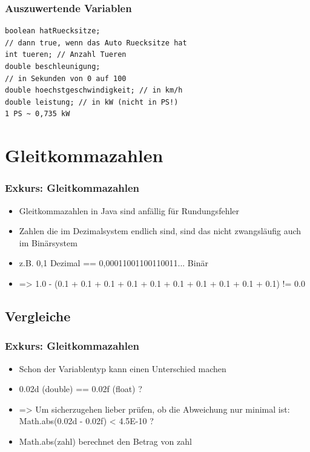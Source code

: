 \documentclass[final]{beamer}
\begin{document}
\begin{frame}[containsverbatim]
	\frametitle{Auszuwertende Variablen}
	\begin{lstlisting}
boolean hatRuecksitze; 
// dann true, wenn das Auto Ruecksitze hat
int tueren; // Anzahl Tueren
double beschleunigung; 
// in Sekunden von 0 auf 100
double hoechstgeschwindigkeit; // in km/h
double leistung; // in kW (nicht in PS!)
1 PS ~ 0,735 kW
	\end{lstlisting}
\end{frame}

\section{Gleitkommazahlen}
\begin{frame}
	\frametitle{Exkurs: Gleitkommazahlen}
	\begin{itemize}
		\item{Gleitkommazahlen in Java sind anfällig für Rundungsfehler}
		\item{Zahlen die im Dezimalsystem endlich sind, sind das nicht zwangsläufig auch im Binärsystem}
		\item{z.B. 0,1 Dezimal == 0,00011001100110011... Binär}
		\item{=> 1.0 - (0.1 + 0.1 + 0.1 + 0.1 + 0.1 + 0.1 + 0.1 + 0.1 + 0.1 + 0.1) != 0.0}
	\end{itemize}
\end{frame}

\subsection{Vergleiche}
\begin{frame}
	\frametitle{Exkurs: Gleitkommazahlen}
	\begin{itemize}
		\item{Schon der Variablentyp kann einen Unterschied machen}
		\item{0.02d (double) == 0.02f (float) ?}
		\item{=> Um sicherzugehen lieber prüfen, ob die Abweichung nur minimal ist: \\ 
		Math.abs(0.02d - 0.02f) < 4.5E-10 ?}
		\item{Math.abs(zahl) berechnet den Betrag von zahl}
	\end{itemize}
\end{frame}
\end{document}
